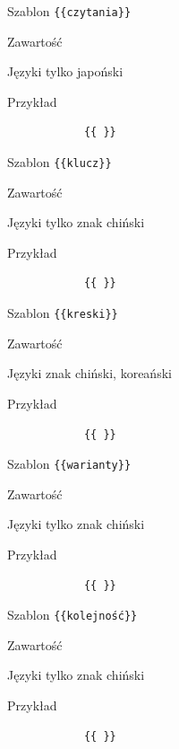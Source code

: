 \documentclass{pracamgr}
\newcommand{\spacer}{
	\begin{center}
		\textasteriskcentered
	\end{center}
}
\newenvironment{description-sub}[0]{
	\begin{basedescript}{\desclabelstyle{\pushlabel}\desclabelwidth{6em}}\setlength{\itemsep}{-2mm}
}{
	\end{basedescript}
}
\begin{document}
\spacer %
\begin{description-sub}
	\item[Szablon] \verb|{{czytania}}|
	\item[Zawartość]
	\item[Języki] tylko japoński
	\item[Przykład]
		\begin{verbatim}
			{{ }}
		\end{verbatim}
\end{description-sub}
\spacer
\begin{description-sub}
	\item[Szablon] \verb|{{klucz}}|
	\item[Zawartość]
	\item[Języki] tylko znak chiński
	\item[Przykład]
		\begin{verbatim}
			{{ }}
		\end{verbatim}
\end{description-sub}
\spacer
\begin{description-sub}
	\item[Szablon] \verb|{{kreski}}|
	\item[Zawartość]
	\item[Języki] znak chiński, koreański
	\item[Przykład]
		\begin{verbatim}
			{{ }}
		\end{verbatim}
\end{description-sub}
\spacer
\begin{description-sub}
	\item[Szablon] \verb|{{warianty}}|
	\item[Zawartość]
	\item[Języki] tylko znak chiński
	\item[Przykład]
		\begin{verbatim}
			{{ }}
		\end{verbatim}
\end{description-sub}
\spacer
\begin{description-sub}
	\item[Szablon] \verb|{{kolejność}}|
	\item[Zawartość]
	\item[Języki] tylko znak chiński
	\item[Przykład]
		\begin{verbatim}
			{{ }}
		\end{verbatim}
\end{description-sub}
\end{document}
